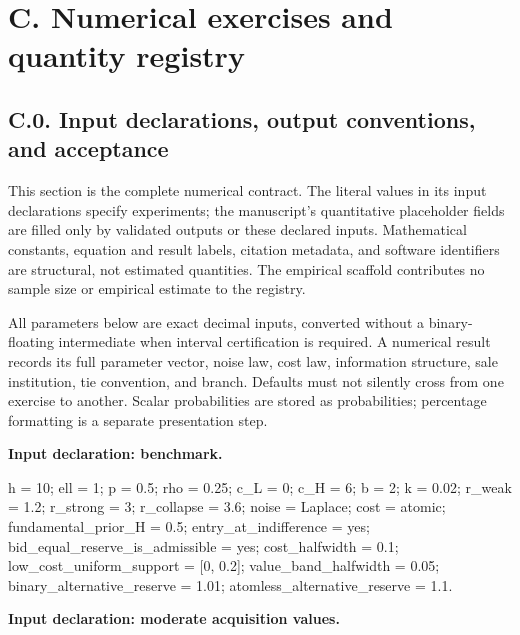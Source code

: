 \documentclass[
  11pt,
]{article}
\newenvironment{Shaded}{}{}
\newcommand{\NormalTok}[1]{#1}
\begin{document}
\section{C. Numerical exercises and quantity registry}\label{oa-c}

\subsection{C.0. Input declarations, output conventions, and
acceptance}\label{oa-c-contract}

This section is the complete numerical contract. The literal values in
its input declarations specify experiments; the manuscript's
quantitative placeholder fields are filled only by validated outputs or
these declared inputs. Mathematical constants, equation and result
labels, citation metadata, and software identifiers are structural, not
estimated quantities. The empirical scaffold contributes no sample size
or empirical estimate to the registry.

All parameters below are exact decimal inputs, converted without a
binary-floating intermediate when interval certification is required. A
numerical result records its full parameter vector, noise law, cost law,
information structure, sale institution, tie convention, and branch.
Defaults must not silently cross from one exercise to another. Scalar
probabilities are stored as probabilities; percentage formatting is a
separate presentation step.


\textbf{Input declaration: benchmark.}

\begin{Shaded}
\begin{Highlighting}[]
\NormalTok{h = 10; ell = 1; p = 0.5; rho = 0.25;}
\NormalTok{c\_L = 0; c\_H = 6; b = 2; k = 0.02;}
\NormalTok{r\_weak = 1.2; r\_strong = 3; r\_collapse = 3.6;}
\NormalTok{noise = Laplace; cost = atomic; fundamental\_prior\_H = 0.5;}
\NormalTok{entry\_at\_indifference = yes; bid\_equal\_reserve\_is\_admissible = yes;}
\NormalTok{cost\_halfwidth = 0.1; low\_cost\_uniform\_support = [0, 0.2];}
\NormalTok{value\_band\_halfwidth = 0.05;}
\NormalTok{binary\_alternative\_reserve = 1.01; atomless\_alternative\_reserve = 1.1.}
\end{Highlighting}
\end{Shaded}


\textbf{Input declaration: moderate acquisition values.}
\end{document}
